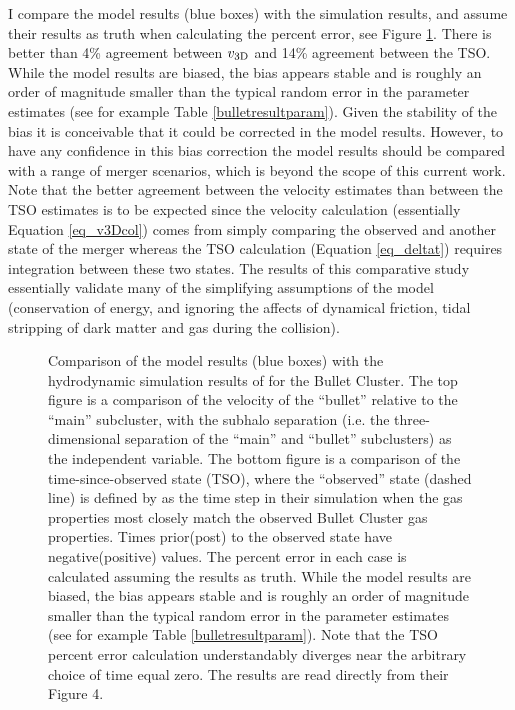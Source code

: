 I compare the model results (blue boxes) with the \citet{Springel:2007bg} simulation results, and assume their results as truth when calculating the percent error, see Figure \ref{fig_SFcomparison}.
There is better than 4\% agreement between $v_{\rm 3D}$ and 14\% agreement between the TSO.
While the model results are biased, the bias appears stable and is roughly an order of magnitude smaller than the typical random error in the parameter estimates (see for example Table \ref{bulletresultparam}).
Given the stability of the bias it is conceivable that it could be corrected in the model results.
However, to have any confidence in this bias correction the model results should be compared with a range of merger scenarios, which is beyond the scope of this current work.
Note that the better agreement between the velocity estimates than between the TSO estimates is to be expected since the velocity calculation (essentially Equation \ref{eq_v3Dcol}) comes from simply comparing the observed and another state of the merger whereas the TSO calculation (Equation \ref{eq_deltat}) requires integration between these two states.
The results of this comparative study essentially validate many of the simplifying assumptions of the model (conservation of energy, and ignoring the affects of dynamical friction, tidal stripping of dark matter and gas during the collision).

\begin{figure}
\caption{
Comparison of the model results (blue boxes) with the hydrodynamic simulation results of \citet[black circles;][]{Springel:2007bg} for the Bullet Cluster.  
The top figure is a comparison of the velocity of the ``bullet'' relative to the ``main'' subcluster, with the subhalo separation (i.e. the three-dimensional separation of the ``main'' and ``bullet'' subclusters) as the independent variable.  
The bottom figure is a comparison of the time-since-observed state (TSO), where the ``observed'' state (dashed line) is defined by \citet{Springel:2007bg} as the time step in their simulation when the gas properties most closely match the observed Bullet Cluster gas properties.
Times prior(post) to the observed state have negative(positive) values.  
The percent error in each case is calculated assuming the \citet{Springel:2007bg} results as truth.  
While the model results are biased, the bias appears stable and is roughly an order of magnitude smaller than the typical random error in the parameter estimates (see for example Table \ref{bulletresultparam}).  
Note that the TSO percent error calculation understandably diverges near the arbitrary choice of time equal zero. 
The \citet{Springel:2007bg} results are read directly from their Figure 4.
\label{fig_SFcomparison}}
\end{figure}

